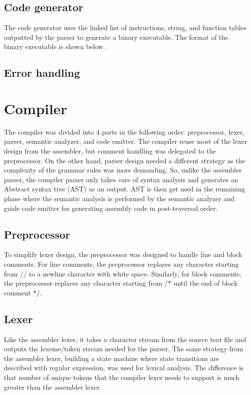 \documentclass[manuscript,screen,nonacm]{acmart}
\begin{document}
\subsection{Code generator}
The code generator uses the linked list of instructions, string, and function tables outputted by the parser to generate a binary executable. The format of the binary executable is shown below.

\subsection{Error handling}

\section{Compiler}
The compiler was divided into 4 parts in the following order: preprocessor, lexer, parser, semantic analyzer, and code emitter. The compiler reuse most of the lexer design from the assembler, but comment handling was delegated to the preprocessor. On the other hand, parser design needed a different strategy as the complexity of the grammar rules was more demanding. So, unlike the assembler parser, the compiler parser only takes care of syntax analysis and generates an Abstract syntax tree (AST) as an output. AST is then get used in the remaining phase where the semantic analysis is performed by the semantic analyzer and guide code emitter for generating assembly code in post-traversal order.

\subsection{Preprocessor}
To simplify lexer design, the preprocessor was designed to handle line and block comments. For line comments, the preprocessor replaces any character starting from // to a newline character with white space. Similarly, for block comments, the preprocessor replaces any character starting from /* until the end of block comment */.

\subsection{Lexer}
Like the assembler lexer, it takes a character stream from the source text file and outputs the lexeme/token stream needed for the parser. The same strategy from the assembler lexer, building a state machine where state transitions are described with regular expression, was used for lexical analysis. The difference is that number of unique tokens that the compiler lexer needs to support is much greater than the assembler lexer.
\end{document}
